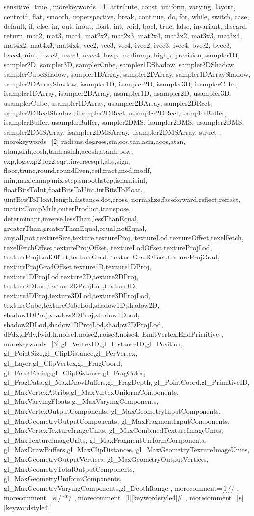 {
	sensitive=true
,	morekeywords=[1]
{
	attribute, const, uniform, varying,
	layout, centroid, flat, smooth,
	noperspective, break, continue, do,
	for, while, switch, case, default, if,
	else, in, out, inout, float, int, void,
	bool, true, false, invariant, discard,
	return, mat2, mat3, mat4, mat2x2, mat2x3,
	mat2x4, mat3x2, mat3x3, mat3x4, mat4x2,
	mat4x3, mat4x4, vec2, vec3, vec4, ivec2,
	ivec3, ivec4, bvec2, bvec3, bvec4, uint,
	uvec2, uvec3, uvec4, lowp, mediump, highp,
	precision, sampler1D, sampler2D, sampler3D,
	samplerCube, sampler1DShadow,
	sampler2DShadow, samplerCubeShadow,
	sampler1DArray, sampler2DArray,
	sampler1DArrayShadow, sampler2DArrayShadow,
	isampler1D, isampler2D, isampler3D,
	isamplerCube, isampler1DArray,
	isampler2DArray, usampler1D, usampler2D,
	usampler3D, usamplerCube, usampler1DArray,
	usampler2DArray, sampler2DRect,
	sampler2DRectShadow, isampler2DRect,
	usampler2DRect, samplerBuffer,
	isamplerBuffer, usamplerBuffer, sampler2DMS,
	isampler2DMS, usampler2DMS,
	sampler2DMSArray, isampler2DMSArray,
	usampler2DMSArray, struct
}
,	morekeywords=[2]
{
	radians,degrees,sin,cos,tan,asin,acos,atan,
	atan,sinh,cosh,tanh,asinh,acosh,atanh,pow,
	exp,log,exp2,log2,sqrt,inversesqrt,abs,sign,
	floor,trunc,round,roundEven,ceil,fract,mod,modf,
	min,max,clamp,mix,step,smoothstep,isnan,isinf,
	floatBitsToInt,floatBitsToUint,intBitsToFloat,
	uintBitsToFloat,length,distance,dot,cross,
	normalize,faceforward,reflect,refract,
	matrixCompMult,outerProduct,transpose,
	determinant,inverse,lessThan,lessThanEqual,
	greaterThan,greaterThanEqual,equal,notEqual,
	any,all,not,textureSize,texture,textureProj,
	textureLod,textureOffset,texelFetch,
	texelFetchOffset,textureProjOffset,
	textureLodOffset,textureProjLod,
	textureProjLodOffset,textureGrad,
	textureGradOffset,textureProjGrad,
	textureProjGradOffset,texture1D,texture1DProj,
	texture1DProjLod,texture2D,texture2DProj,
	texture2DLod,texture2DProjLod,texture3D,
	texture3DProj,texture3DLod,texture3DProjLod,
	textureCube,textureCubeLod,shadow1D,shadow2D,
	shadow1DProj,shadow2DProj,shadow1DLod,
	shadow2DLod,shadow1DProjLod,shadow2DProjLod,
	dFdx,dFdy,fwidth,noise1,noise2,noise3,noise4,
	EmitVertex,EndPrimitive
}
,	morekeywords=[3]
{
	gl_VertexID,gl_InstanceID,gl_Position,
	gl_PointSize,gl_ClipDistance,gl_PerVertex,
	gl_Layer,gl_ClipVertex,gl_FragCoord,
	gl_FrontFacing,gl_ClipDistance,gl_FragColor,
	gl_FragData,gl_MaxDrawBuffers,gl_FragDepth,
	gl_PointCoord,gl_PrimitiveID,
	gl_MaxVertexAttribs,gl_MaxVertexUniformComponents,
	gl_MaxVaryingFloats,gl_MaxVaryingComponents,
	gl_MaxVertexOutputComponents,
	gl_MaxGeometryInputComponents,
	gl_MaxGeometryOutputComponents,
	gl_MaxFragmentInputComponents,
	gl_MaxVertexTextureImageUnits,
	gl_MaxCombinedTextureImageUnits,
	gl_MaxTextureImageUnits,
	gl_MaxFragmentUniformComponents,
	gl_MaxDrawBuffers,gl_MaxClipDistances,
	gl_MaxGeometryTextureImageUnits,
	gl_MaxGeometryOutputVertices,
	gl_MaxGeometryOutputVertices,
	gl_MaxGeometryTotalOutputComponents,
	gl_MaxGeometryUniformComponents,
	gl_MaxGeometryVaryingComponents,gl_DepthRange
}
,	morecomment=[l]{//}
,	morecomment=[s]{/*}{*/}
,	morecomment=[l][keywordstyle4]{\#}
,	morecomment=[s][keywordstyle4]{\"}{\"}
}

